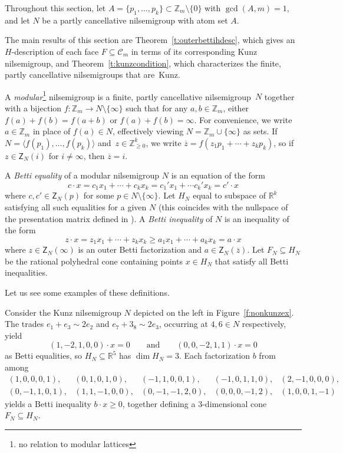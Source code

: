 \documentclass[ALCO, Unicode]{cedram}
\newcommand\ZZ{\mathbb{Z}}
\newcommand\RR{\mathbb{R}}
\newcommand\cC{{\mathcal C}}
\begin{document}
Throughout this section, let $A = \{p_1,\ldots,p_k\} \subset \ZZ_m \setminus \{0\}$ with $\gcd(A,m) = 1$, and let $N$ be a partly cancellative nilsemigroup with atom set $A$.

The main results of this section are Theorem~\ref{t:outerbettihdesc}, which gives an $H$-description of each face $F \subseteq \cC_m$ in terms of its corresponding Kunz nilsemigroup, and Theorem~\ref{t:kunzcondition}, which characterizes the finite, partly cancellative nilsemigroups that are~Kunz.  

\begin{defi}\label{d:modularnilsemigroup}
A \emph{modular}\footnote{no relation to modular lattices} nilsemigroup is a finite, partly cancellative nilsemigroup~$N$ together with a bijection $f : \ZZ_m \to N \setminus \{\infty\}$ such that for any $a,b\in\ZZ_m$, either $f(a) + f(b) = f(a+b)$ or $f(a) + f(b) = \infty$.  For convenience, we write $a \in \ZZ_m$ in place of $f(a) \in N$, effectively viewing $N = \ZZ_m \cup \{\infty\}$ as sets.  If $N = \langle f(p_1), \ldots, f(p_k) \rangle$ and~$z \in \ZZ_{\ge 0}^k$, we write $\overline z = f(z_1p_1 + \cdots + z_kp_k)$, so if $z \in \mathsf Z_N(i)$ for $i \ne \infty$, then $\overline z = i$.  

A \emph{Betti equality} of a modular nilsemigroup $N$ is an equation of the form 
\[
c \cdot x = c_1x_1 + \cdots + c_kx_k = c_1'x_1+ \cdots c_k'x_k = c'\cdot x  
\]
where $c,c' \in \mathsf{Z}_N(p)$ for some $p \in N \setminus \{\infty\}$.  Let $H_N$ equal to subspace of $\RR^k$ satisfying all such equalities for a given $N$ (this coincides with the nullspace of the presentation matrix defined in \cite[Section~4]{kunzfaces3}).  
A \emph{Betti inequality} of $N$ is an inequality of the form 
\[
z \cdot x = z_1x_1 + \cdots + z_kx_k \geq a_1x_1 + \cdots + a_kx_k = a \cdot x  
\]
where $z \in \mathsf{Z}_N(\infty)$ is an outer Betti factorization and $a \in \mathsf{Z}_N(\overline{z})$.  Let $F_N \subseteq H_N$ be the rational polyhedral cone containing points $x \in H_N$ that satisfy all Betti inequalities.  
\end{defi}

Let us see some examples of these definitions.

\begin{exam}\label{e:bettiequality}
Consider the Kunz nilsemigroup $N$ depicted on the left in Figure~\ref{f:nonkunzex}.  The trades $e_1 + e_3 \sim 2e_2$ and $e_7 + 3_8 \sim 2e_3$, occurring at $4, 6 \in N$ respectively, yield 
\[
(1,-2,1,0,0) \cdot x = 0
\qquad \text{and} \qquad
(0,0,-2,1,1) \cdot x = 0
\]
as Betti equalities, so $H_N \subseteq \RR^5$ has $\dim H_N = 3$.  Each factorization $b$ from among 
$$\begin{array}{lllll}
(1, 0, 0, 0, 1),
&
(0, 1, 0, 1, 0),
&
(-1, 1, 0, 0, 1),
&
(-1, 0, 1, 1, 0),
&
(2, -1, 0, 0, 0),
\\
(0, -1, 1, 0, 1),
&
(1, 1, -1, 0, 0),
&
(0, -1, -1, 2, 0),
&
(0, 0, 0, -1, 2),
&
(1, 0, 0, 1, -1)
\end{array}$$
yields a Betti inequality $b \cdot x \ge 0$, together defining a 3-dimensional cone $F_N \subseteq H_N$.  
\end{exam}
\end{document}
